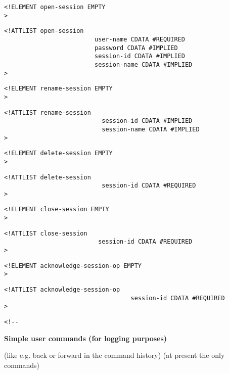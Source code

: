 \begin{verbatim}
<!ELEMENT open-session EMPTY 
>\end{verbatim}

\begin{verbatim}
<!ATTLIST open-session 
                         user-name CDATA #REQUIRED
                         password CDATA #IMPLIED
                         session-id CDATA #IMPLIED
                         session-name CDATA #IMPLIED
>\end{verbatim}

\begin{verbatim}
<!ELEMENT rename-session EMPTY 
>\end{verbatim}

\begin{verbatim}
<!ATTLIST rename-session 
                           session-id CDATA #IMPLIED
                           session-name CDATA #IMPLIED
>\end{verbatim}

\begin{verbatim}
<!ELEMENT delete-session EMPTY 
>\end{verbatim}

\begin{verbatim}
<!ATTLIST delete-session 
                           session-id CDATA #REQUIRED
>\end{verbatim}

\begin{verbatim}
<!ELEMENT close-session EMPTY 
>\end{verbatim}

\begin{verbatim}
<!ATTLIST close-session 
                          session-id CDATA #REQUIRED
>\end{verbatim}

\begin{verbatim}
<!ELEMENT acknowledge-session-op EMPTY 
>\end{verbatim}

\begin{verbatim}
<!ATTLIST acknowledge-session-op 
                                   session-id CDATA #REQUIRED
>\end{verbatim}

\begin{verbatim}<!--\end{verbatim}
  

     \textbf{Simple user commands (for logging purposes)}

     (like e.g. back or forward 
         in the command history)
     (at present the only commands)
      

